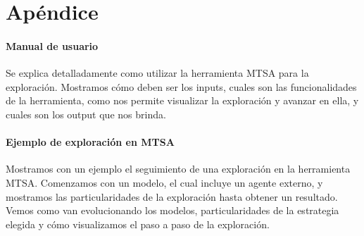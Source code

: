 \chapter{Apéndice}

\subsubsection{Manual de usuario}

Se explica detalladamente como utilizar la herramienta MTSA para la exploración. 
Mostramos cómo deben ser los inputs, cuales son las funcionalidades de la herramienta, como nos permite visualizar 
la exploración y avanzar en ella, y cuales son los output que nos brinda.

\subsubsection{Ejemplo de exploración en MTSA}

Mostramos con un ejemplo el seguimiento de una exploración en la herramienta MTSA. 
Comenzamos con un modelo, el cual incluye un agente externo, y mostramos las particularidades de la exploración hasta obtener un resultado. 
Vemos como van evolucionando los modelos, particularidades de la estrategia elegida y cómo visualizamos el paso a paso de la exploración.

